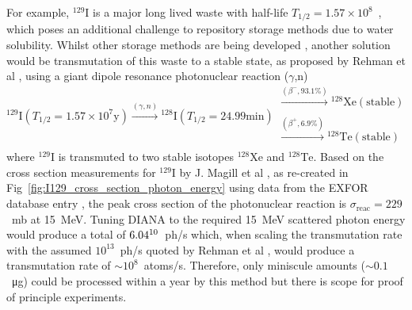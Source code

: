 \documentclass[../main.tex]{subfiles}
\begin{document}
For example, $^{129}\mathrm{I}$ is a major long lived waste with half-life $T_{1/2} = 1.57\times 10^{8}$~\si{\years}, which poses an additional challenge to repository storage methods \cite{cho2016reconsideration} due to water solubility. Whilst other storage methods are being developed \cite{lee2021chemical,morizet2021immobilization}, another solution would be transmutation of this waste to a stable state, as proposed by Rehman et al \cite{ur2017optimization}, using a giant dipole resonance photonuclear reaction ($\gamma$,n) 
\begin{equation}
^{129}\mathrm{I} \left(T_{1/2}=1.57\times 10^{7}\textrm{y}\right) \xrightarrow[]{\left(\gamma,n\right)} {}^{128}\mathrm{I} \left(T_{1/2}=24.99\mathrm{\si{\minute}}\right) \substack{\xrightarrow[]{\left(\beta^{-},93.1\%\right)} {}^{128}\mathrm{Xe}\left(\mathrm{stable}\right)\\[0.1em] \xrightarrow[]{\left(\beta^{+},6.9\%\right)} {}^{128}\mathrm{Te}\left(\mathrm{stable}\right)}
\label{eq:129I_photonuclear_transmutation}
\end{equation}
where $^{129}\mathrm{I}$ is transmuted to two stable isotopes $^{128}\mathrm{Xe}$ and $^{128}\mathrm{Te}$. Based on the cross section measurements for $^{129}\mathrm{I}$ by J. Magill et al \cite{magill2003laser}, as re-created in Fig~\ref{fig:I129_cross_section_photon_energy} using data from the EXFOR database entry \cite{zerkin2018experimental}, the peak cross section of the photonuclear reaction is $\sigma_{\mathrm{reac}} = 229$~\si{\milli\barn} at 15~\si{\mega\electronvolt}. Tuning DIANA to the required 15~\si{\mega\electronvolt} scattered photon energy would produce a total of $6.04\time 10^{10}$~ph/\si{\second} which, when scaling the transmutation rate with the assumed $10^{13}$~ph/\si{\second} quoted by Rehman et al \cite{ur2017optimization}, would produce a transmutation rate of $\sim10^{8}$~atoms/\si{\second}. Therefore, only miniscule amounts ($\sim0.1$~\si{\micro\gram}) could be processed within a year by this method but there is scope for proof of principle experiments.  
\end{document}
